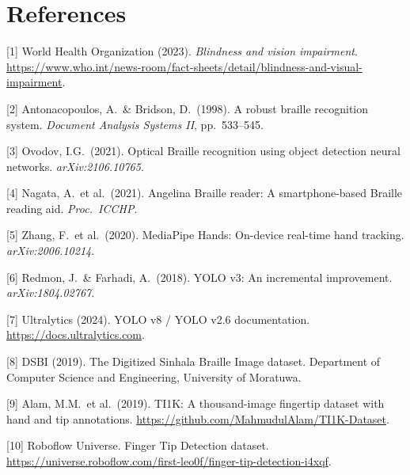 \documentclass{article}
\begin{document}
\section*{References}
\begin{small}

[1] World Health Organization (2023). \textit{Blindness and vision impairment}.
\url{https://www.who.int/news-room/fact-sheets/detail/blindness-and-visual-impairment}.

[2] Antonacopoulos, A.\ \& Bridson, D.\ (1998). A robust braille recognition system.
\textit{Document Analysis Systems II}, pp.\ 533–545.

[3] Ovodov, I.G.\ (2021). Optical Braille recognition using object detection neural networks.
\textit{arXiv:2106.10765}.

[4] Nagata, A.\ et al.\ (2021). Angelina Braille reader: A smartphone-based Braille
reading aid. \textit{Proc.\ ICCHP}.

[5] Zhang, F.\ et al.\ (2020). MediaPipe Hands: On-device real-time hand tracking.
\textit{arXiv:2006.10214}.

[6] Redmon, J.\ \& Farhadi, A.\ (2018). YOLO v3: An incremental improvement.
\textit{arXiv:1804.02767}.

[7] Ultralytics (2024). YOLO v8 / YOLO v2.6 documentation.
\url{https://docs.ultralytics.com}.

[8] DSBI (2019). The Digitized Sinhala Braille Image dataset.
Department of Computer Science and Engineering, University of Moratuwa.

[9] Alam, M.M.\ et al.\ (2019). TI1K: A thousand-image fingertip dataset
with hand and tip annotations.
\url{https://github.com/MahmudulAlam/TI1K-Dataset}.

[10] Roboflow Universe. Finger Tip Detection dataset.
\url{https://universe.roboflow.com/first-leo0f/finger-tip-detection-i4xqf}.

\end{small}

\newpage

\end{document}
